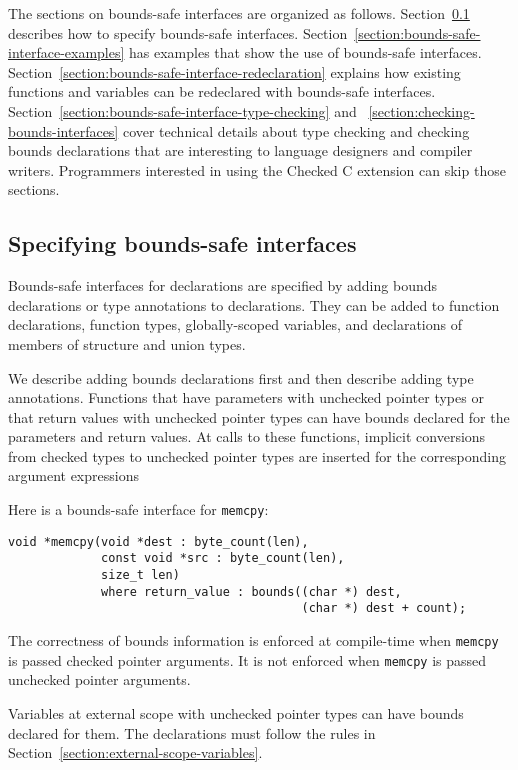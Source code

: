The sections on bounds-safe interfaces are organized as
follows.  Section~\ref{section:bounds-safe-interface-specifying} describes
how to specify bounds-safe interfaces.
Section~\ref{section:bounds-safe-interface-examples}
has examples that show the use of bounds-safe interfaces.
Section~\ref{section:bounds-safe-interface-redeclaration} explains
how existing functions and variables can be redeclared with bounds-safe
interfaces.  Section~\ref{section:bounds-safe-interface-type-checking}
and ~\ref{section:checking-bounds-interfaces} cover technical details
about type checking and checking bounds declarations that are interesting
to language designers and compiler writers.  Programmers interested
in using the Checked C extension can skip those sections.

\subsection{Specifying bounds-safe interfaces}
\label{section:bounds-safe-interface-specifying}
Bounds-safe interfaces for declarations are specified by adding bounds
declarations or type annotations to declarations.  They can be added to
function declarations, function types, globally-scoped variables, and
declarations of members of structure and union types.

We describe adding bounds declarations first and then  describe adding type
annotations.  Functions that have parameters with unchecked pointer
types or that return values with unchecked pointer types can have bounds
declared for the parameters and return values.  At calls to
these functions, implicit conversions from checked types to unchecked
pointer types are inserted for the corresponding argument expressions
  
Here is a bounds-safe interface for \texttt{memcpy}:
\begin{lstlisting}
void *memcpy(void *dest : byte_count(len),
             const void *src : byte_count(len), 
             size_t len) 
             where return_value : bounds((char *) dest,
                                         (char *) dest + count);
\end{lstlisting}
The correctness of bounds information is enforced at compile-time when
\texttt{memcpy} is passed checked pointer arguments. It is not enforced when 
\texttt{memcpy} is passed unchecked pointer arguments.

Variables at external scope with unchecked pointer types can have
bounds declared for them.   The declarations must follow the 
rules in Section~\ref{section:external-scope-variables}.

